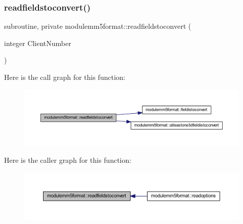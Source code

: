 \mbox{\label{namespacemodulemm5format_aab58f65fed0eaf2db8d40727bfaaf7ab}} 
\subsubsection{\texorpdfstring{readfieldstoconvert()}{readfieldstoconvert()}}
{\footnotesize\ttfamily subroutine, private modulemm5format\+::readfieldstoconvert (\begin{DoxyParamCaption}\item[{integer}]{Client\+Number }\end{DoxyParamCaption})\hspace{0.3cm}{\ttfamily [private]}}

Here is the call graph for this function\+:\nopagebreak
\begin{figure}[H]
\begin{center}
\leavevmode
\includegraphics[width=350pt]{namespacemodulemm5format_aab58f65fed0eaf2db8d40727bfaaf7ab_cgraph}
\end{center}
\end{figure}
Here is the caller graph for this function\+:\nopagebreak
\begin{figure}[H]
\begin{center}
\leavevmode
\includegraphics[width=350pt]{namespacemodulemm5format_aab58f65fed0eaf2db8d40727bfaaf7ab_icgraph}
\end{center}
\end{figure}
\mbox{\label{namespacemodulemm5format_a97e9dde30f26c338513668851aff53f5}} 
